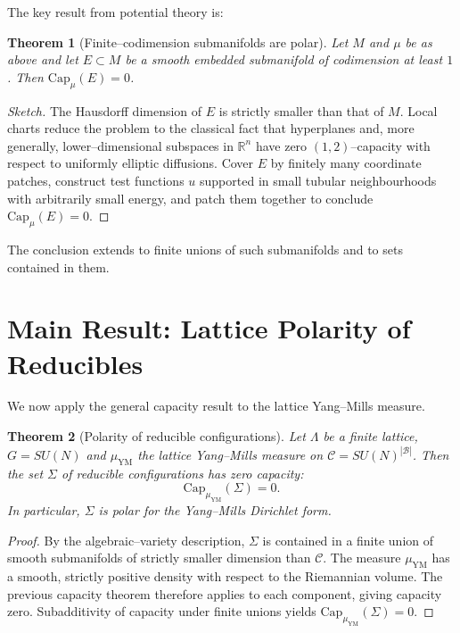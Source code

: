 \documentclass[11pt]{article}
\newtheorem{theorem}{Theorem}[section]
\begin{document}
The key result from potential theory is:

\begin{theorem}[Finite--codimension submanifolds are polar]
Let $M$ and $\mu$ be as above and let $E\subset M$ be a smooth embedded
submanifold of codimension at least $1$. Then $\mathrm{Cap}_\mu(E)=0$.
\end{theorem}

\begin{proof}[Sketch]
The Hausdorff dimension of $E$ is strictly smaller than that of $M$.
Local charts reduce the problem to the classical fact that hyperplanes
and, more generally, lower--dimensional subspaces in $\mathbb{R}^n$ have
zero $(1,2)$--capacity with respect to uniformly elliptic diffusions.
Cover $E$ by finitely many coordinate patches, construct test functions
$u$ supported in small tubular neighbourhoods with arbitrarily small
energy, and patch them together to conclude $\mathrm{Cap}_\mu(E)=0$.
\end{proof}

The conclusion extends to finite unions of such submanifolds and to sets
contained in them.

\section{Main Result: Lattice Polarity of Reducibles}

We now apply the general capacity result to the lattice Yang--Mills
measure.

\begin{theorem}[Polarity of reducible configurations]
Let $\Lambda$ be a finite lattice, $G=SU(N)$ and $\mu_{\mathrm{YM}}$ the
lattice Yang--Mills measure on $\mathcal{C}=SU(N)^{|\mathcal{B}|}$.
Then the set $\Sigma$ of reducible configurations has zero capacity:
\begin{equation}
  \mathrm{Cap}_{\mu_{\mathrm{YM}}}(\Sigma) = 0.
\end{equation}
In particular, $\Sigma$ is polar for the Yang--Mills Dirichlet form.
\end{theorem}

\begin{proof}
By the algebraic--variety description, $\Sigma$ is contained in a finite
union of smooth submanifolds of strictly smaller dimension than
$\mathcal{C}$. The measure $\mu_{\mathrm{YM}}$ has a smooth, strictly
positive density with respect to the Riemannian volume. The previous
capacity theorem therefore applies to each component, giving capacity
zero. Subadditivity of capacity under finite unions yields
$\mathrm{Cap}_{\mu_{\mathrm{YM}}}(\Sigma)=0$.
\end{proof}
\end{document}
